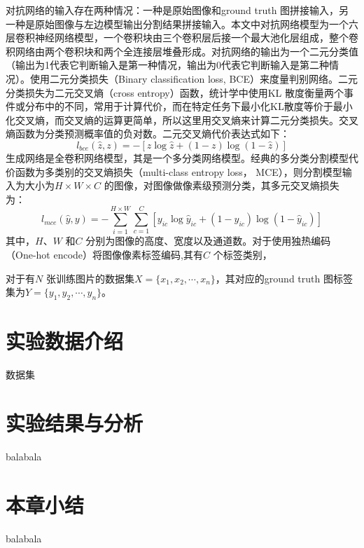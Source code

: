 对抗网络的输入存在两种情况：一种是原始图像和ground truth 图拼接输入，另一种是原始图像与左边模型输出分割结果拼接输入。本文中对抗网络模型为一个六层卷积神经网络模型，一个卷积块由三个卷积层后接一个最大池化层组成，整个卷积网络由两个卷积块和两个全连接层堆叠形成。对抗网络的输出为一个二元分类值（输出为1代表它判断输入是第一种情况，输出为0代表它判断输入是第二种情况）。使用二元分类损失（Binary classification loss, BCE）来度量判别网络。二元分类损失为二元交叉熵（cross entropy）函数，统计学中使用KL 散度衡量两个事件或分布中的不同，常用于计算代价，而在特定任务下最小化KL散度等价于最小化交叉熵，而交叉熵的运算更简单\cite{de2005tutorial}，所以这里用交叉熵来计算二元分类损失。交叉熵函数为分类预测概率值的负对数。二元交叉熵代价表达式如下：
\begin{equation}
  \label{eq:4-4}
  l_{bce} (\hat{z}, z) = -[z\log\hat{z} + (1-z)\log(1-\hat{z})]
\end{equation}
生成网络是全卷积网络模型，其是一个多分类网络模型。经典的多分类分割模型代价函数为多类别的交叉熵损失（multi-class entropy loss， MCE），则分割模型输入为大小为$H\times W\times C$ 的图像，对图像做像素级预测分类，其多元交叉熵损失为：
\begin{equation}
  \label{eq:4-5}
  l_{mce} (\hat{y}, y) = -\sum_{i=1}^{H\times W}\sum_{c=1}^{C}[y_{ic}\log\hat{y}_{ic} + (1-y_{ic})\log(1-\hat{y}_{ic})]
\end{equation}
其中，$H$、$W$ 和$C$ 分别为图像的高度、宽度以及通道数。对于使用独热编码（One-hot encode）将图像像素标签编码,其有$C$ 个标签类别，

对于有$N$ 张训练图片的数据集$X = \{x_1,x_2,\cdots, x_n \}$，其对应的ground truth 图标签集为$Y = \{y_1,y_2,\cdots, y_n \}$。

\section{实验数据介绍}
数据集

\section{实验结果与分析}
balabala

\section{本章小结}
balabala